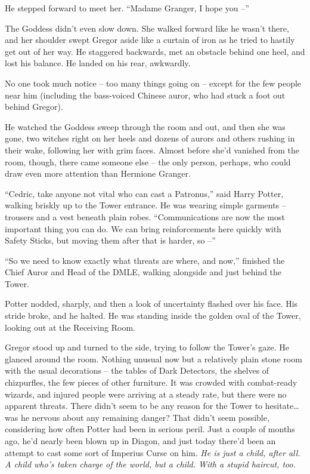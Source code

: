 He stepped forward to meet her. ``Madame Granger, I hope you --''

The Goddess didn't even slow down. She walked forward like he wasn't
there, and her shoulder swept Gregor aside like a curtain of iron as he
tried to hastily get out of her way. He staggered backwards, met an
obstacle behind one heel, and lost his balance. He landed on his rear,
awkwardly.

No one took much notice -- too many things going on -- except for the
few people near him (including the bass-voiced Chinese auror, who had
stuck a foot out behind Gregor).

He watched the Goddess sweep through the room and out, and then she was
gone, two witches right on her heels and dozens of aurors and others
rushing in their wake, following her with grim faces. Almost before
she'd vanished from the room, though, there came someone else -- the
only person, perhaps, who could draw even more attention than Hermione
Granger.

``Cedric, take anyone not vital who can cast a Patronus,'' said Harry
Potter, walking briskly up to the Tower entrance. He was wearing simple
garments -- trousers and a vest beneath plain robes. ``Communications
are now the most important thing you can do. We can bring reinforcements
here quickly with Safety Sticks, but moving them after that is harder,
so --''

``So we need to know exactly what threats are where, and now,'' finished
the Chief Auror and Head of the DMLE, walking alongside and just behind
the Tower.

Potter nodded, sharply, and then a look of uncertainty flashed over his
face. His stride broke, and he halted. He was standing inside the golden
oval of the Tower, looking out at the Receiving Room.

Gregor stood up and turned to the side, trying to follow the Tower's
gaze. He glanced around the room. Nothing unusual now but a relatively
plain stone room with the usual decorations -- the tables of Dark
Detectors, the shelves of chizpurfles, the few pieces of other
furniture. It was crowded with combat-ready wizards, and injured people
were arriving at a steady rate, but there were no apparent threats.
There didn't seem to be any reason for the Tower to hesitate\ldots{} was
he nervous about any remaining danger? That didn't seem possible,
considering how often Potter had been in serious peril. Just a couple of
months ago, he'd nearly been blown up in Diagon, and just today there'd
been an attempt to cast some sort of Imperius Curse on him. \emph{He is
just a child, after all. A child who's taken charge of the world, but a
child. With a stupid haircut, too.}

